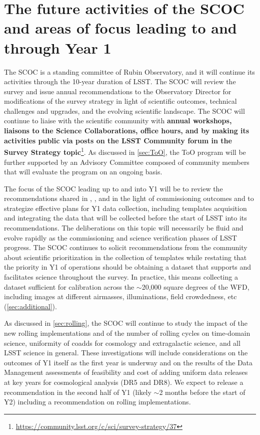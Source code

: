 \section{The future activities of the SCOC and areas of focus leading to and through Year 1}\label{sec:next}

The SCOC is a standing committee of Rubin Observatory, and it will continue its activities through the 10-year duration of LSST. The SCOC will review the survey and issue annual recommendations to the Observatory Director for modifications of the survey strategy in light of scientific outcomes, technical challenges and upgrades, and the evolving scientific landscape. The SCOC will continue to liaise with the scientific community with {\bf annual workshops, liaisons to the Science Collaborations, office hours, and by making its activities public via posts on the LSST Community forum in the Survey Strategy topic}\footnote{\url{https://community.lsst.org/c/sci/survey-strategy/37}}. As discussed in \autoref{sec:ToO}, the ToO program will be further supported by an Advisory Committee composed of community members that will evaluate the program on an ongoing basis. 

The focus of the SCOC leading up to and into Y1 will be to review the recommendations shared in , , and  in the light of commissioning outcomes and to strategize effective plans for Y1 data collection, including templates acquisition and integrating the data that will be collected before the start of LSST into its recommendations. The deliberations on this topic will necessarily be fluid and evolve rapidly as the commissioning and science verification phases of LSST progress. The SCOC continues to solicit recommendations from the community about scientific prioritization in the collection of templates while restating that the priority in Y1 of operations should be obtaining a dataset that supports and facilitates science throughout the survey. In practice, this means collecting a dataset sufficient for calibration across the \mbox{$\sim$20,000} square degrees of the WFD, including images at different airmasses, illuminations, field crowdedness, etc (\autoref{sec:additional}).

As discussed in \autoref{sec:rolling}, the SCOC will continue to study the impact of the new rolling implementations and of the number of rolling cycles on time-domain science, uniformity of coadds for cosmology and extragalactic science, and all LSST science in general. These investigations will include considerations on the outcomes of Y1 itself as the first year is underway and on the results of the Data Management assessments of feasibility and cost of adding uniform data releases at key years for cosmological analysis (DR5 and DR8). We expect to release a recommendation in the second half of Y1 (likely \mbox{$\sim$2} months before the start of Y2) including a recommendation on rolling implementations.

